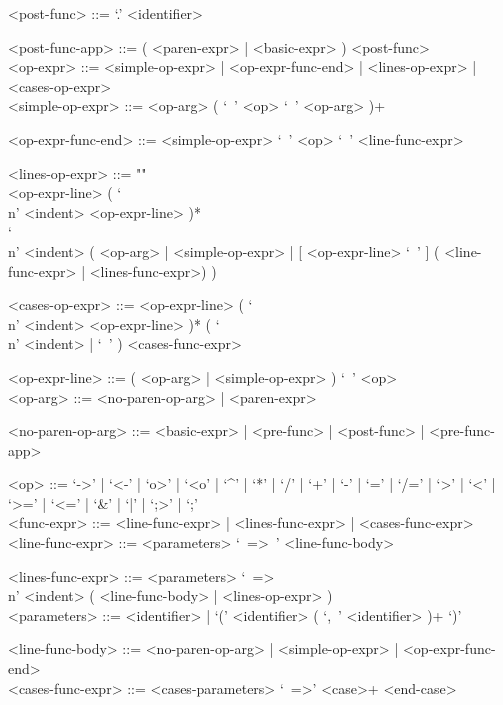 \documentclass{article}
\begin{document}
\begin{grammar}
<post-func> ::= `.' <identifier>

<post-func-app> ::= ( <paren-expr> | <basic-expr> ) <post-func> \\

<op-expr> ::=
<simple-op-expr> | <op-expr-func-end> | <lines-op-expr> | <cases-op-expr>
\\

<simple-op-expr> ::=  <op-arg> ( `\ ' <op>  `\ ' <op-arg> )+

<op-expr-func-end> ::= <simple-op-expr> `\ '  <op> `\ ' <line-func-expr>

<lines-op-expr> ::= ""\\
<op-expr-line> ( `\\n' <indent> <op-expr-line> )* \\
`\\n' <indent>
( <op-arg> | <simple-op-expr> |
  [ <op-expr-line> `\ ' ] ( <line-func-expr> | <lines-func-expr>)
)

<cases-op-expr> ::=
<op-expr-line> ( `\\n' <indent> <op-expr-line> )*
( `\\n' <indent> | `\ ' ) <cases-func-expr> 

<op-expr-line> ::= ( <op-arg> | <simple-op-expr> ) `\ ' <op> 
\\

<op-arg> ::= <no-paren-op-arg> | <paren-expr>

<no-paren-op-arg> ::= <basic-expr> | <pre-func> | <post-func> | <pre-func-app>

<op> ::= 
`->' | `<-' | `o>' | `<o' | `^' | `*' | `/' | `+' | `-' |
`=' | `/=' | `>' | `<' | `>=' | `<=' | `\&' | `|' | `;>' | `;'\\

<func-expr> ::= <line-func-expr> | <lines-func-expr> | <cases-func-expr> \\

<line-func-expr> ::= <parameters> `\ =>\ ' <line-func-body>

<lines-func-expr> ::=
<parameters> `\ =>\\n' <indent> ( <line-func-body> | <lines-op-expr> )
\\

<parameters> ::= <identifier> | `(' <identifier> ( `,\ ' <identifier> )+ `)'

<line-func-body> ::= <no-paren-op-arg> | <simple-op-expr> | <op-expr-func-end> \\

<cases-func-expr> ::= <cases-parameters> `\ =>' <case>+ <end-case> 


\end{grammar}
\end{document}

